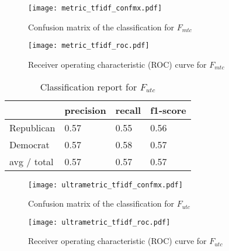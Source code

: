 \documentclass[10pt,11pt,12pt,oneside]{book}
\begin{document}
\begin{figure}[H]
	\begin{center}
		\texttt{[image: metric\_tfidf\_confmx.pdf]}\\
		\caption{Confusion matrix of the classification for $ F_{mtc} $}
	\end{center}
\end{figure}

\begin{figure}[H]
	\begin{center}
	\texttt{[image: metric\_tfidf\_roc.pdf]}\\
	\caption{Receiver operating characteristic (ROC) curve for $ F_{mtc} $}
	\end{center}
\end{figure}

\clearpage


\newpage
\vspace{0.5cm}
\begin{table}[H]
	\begin{tabular}{ | p{5cm} || p{3cm} | p{3cm} | p{3cm} |}
		\hline
		& precision & recall & f1-score\\
		\hline
		Republican & 0.57 & 0.55 & 0.56\\
		\hline
		Democrat & 0.57 & 0.58 & 0.57\\  
		\hline
		avg / total  & 0.57 & 0.57 & 0.57 \\
		\hline
	\end{tabular}
	\caption{Classification report for $ F_{utc} $}
	\label{cr_ultrametrictfidf}
\end{table}

\begin{figure}[H]
	\begin{center}
		\texttt{[image: ultrametric\_tfidf\_confmx.pdf]}\\
		\caption{Confusion matrix of the classification for $ F_{utc} $}
	\end{center}
\end{figure}

\begin{figure}[H]
	\begin{center}
		\texttt{[image: ultrametric\_tfidf\_roc.pdf]}\\
		\caption{Receiver operating characteristic (ROC) curve for $ F_{utc} $}
	\end{center}
\end{figure}
\end{document}
